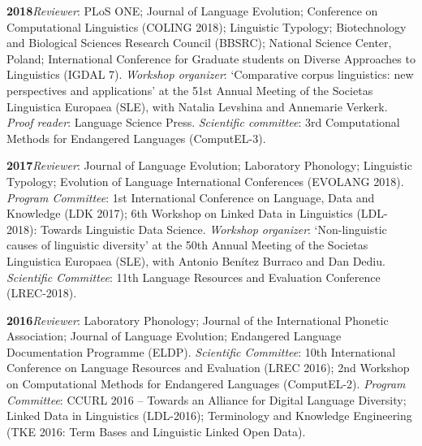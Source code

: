 \documentclass[11pt]{article}
\newcommand{\hangpara}{
 \setlength{\parindent}{0in} %
 \hangindent=0.42in %
}
\begin{document}

\vskip 6pt
\hangpara
{\bf 2018}\hspace{1ex}\textit{Reviewer}: PLoS ONE; Journal of Language Evolution; Conference on Computational Linguistics (COLING 2018); Linguistic Typology; Biotechnology and Biological Sciences Research Council (BBSRC); National Science Center, Poland; International Conference for Graduate students on Diverse Approaches to Linguistics (IGDAL 7). \textit{Workshop organizer}: `Comparative corpus linguistics: new perspectives and applications' at the 51st Annual Meeting of the Societas Linguistica Europaea (SLE), with Natalia Levshina and Annemarie Verkerk. \textit{Proof reader}: Language Science Press. \textit{Scientific committee}: 3rd Computational Methods for Endangered Languages (ComputEL-3).

\vskip 6pt
\hangpara
{\bf 2017}\hspace{1ex}\textit{Reviewer}: Journal of Language Evolution; Laboratory Phonology; Linguistic Typology; Evolution of Language International Conferences (EVOLANG 2018). \textit{Program Committee}: 1st International Conference on Language, Data and Knowledge (LDK 2017); 6th Workshop on Linked Data in Linguistics (LDL-2018): Towards Linguistic Data Science. \textit{Workshop organizer}: `Non-linguistic causes of linguistic diversity' at the 50th Annual Meeting of the Societas Linguistica Europaea (SLE), with Antonio Ben{\'i}tez Burraco and Dan Dediu. \textit{Scientific Committee}: 11th Language Resources and Evaluation Conference (LREC-2018).

\vskip 6pt
\hangpara
{\bf 2016}\hspace{1ex}\textit{Reviewer}: Laboratory Phonology; Journal of the International Phonetic Association; Journal of Language Evolution; Endangered Language Documentation Programme (ELDP).
\textit{Scientific Committee}: 10th International Conference on Language Resources and Evaluation (LREC 2016); 2nd Workshop on Computational Methods for Endangered Languages (ComputEL-2). \textit{Program Committee}: CCURL 2016 -- Towards an Alliance for Digital Language Diversity; Linked Data in Linguistics (LDL-2016); Terminology and Knowledge Engineering (TKE 2016: Term Bases and Linguistic Linked Open Data).
\end{document}
